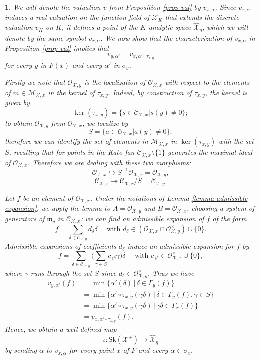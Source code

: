 \documentclass{amsart}%
\numberwithin{equation}{subsection}
\theoremstyle{plain2}
\theoremstyle{definition2}
\theoremstyle{stepstyle}
\theoremstyle{point}
\theoremstyle{subpoint}
\newtheorem{subpoint}[equation]{}%
\newcommand{\spa}[1]{\begin{subpoint}#1\end{subpoint}}           %
\newcommand{\cX}{\ensuremath{\mathscr{X}}}
\newcommand{\caM}{\ensuremath{\mathcal{M}}}
\newcommand{\caC}{\ensuremath{\mathcal{C}}}
\newcommand{\caO}{\ensuremath{\mathcal{O}}}
\newcommand{\Sk}{\mathrm{Sk}}
\begin{document}
\spa{ We will denote the valuation $v$ from Proposition
\ref{prop-val} by $v_{x,\alpha}$. Since $v_{x,\alpha}$ induces a real valuation on the function field of $\cX_K$ that extends the discrete valuation $v_K$ on $K$, it defines a point of the $K$-analytic space $\widehat{\cX}_\eta$, which we will denote by the same symbol $v_{x,\alpha}$. We now show that the characterization of $v_{x,\alpha}$ in Proposition \ref{prop-val} implies that $$v_{y,\alpha'}=v_{x,\alpha'\circ \tau_{x,y}}$$ for every $y$ in $F(x)$ and every $\alpha'$ in $\sigma_y$.

Firstly we note that  $\mathcal{O}_{\cX,y}$ is the localization of $\mathcal{O}_{\cX,x}$ with respect to the elements of $m\in \mathcal{M}_{\cX,x}$ in the kernel of $\tau_{x,y}$.
Indeed, by construction of $\tau_{x,y}$, the kernel is given by $$\ker (\tau_{x,y})= \{s \in \caC_{\cX,x} | s(y) \neq 0 \};$$ to obtain $\mathcal{O}_{\cX,y}$ from $\mathcal{O}_{\cX,x}$, we localize  by $$S=\{a \in \mathcal{O}_{\cX,x} | a(y) \neq 0 \};$$ therefore we can identify the set of elements in $\caM_{\cX,x}$ in $\ker(\tau_{x,y})$ with the set $S$, recalling that for points in the Kato fan $\mathcal{C}_{\cX,x}\setminus \{1\}$ generates the maximal ideal of $\mathcal{O}_{\cX,x}$. Therefore we are dealing with these two morphisms:
$$\caO_{\cX,x} \hookrightarrow S^{-1}\caO_{\cX,x}=\caO_{\cX,y},$$
$$ \caC_{\cX,x} \twoheadrightarrow \caC_{\cX,x}/S = \caC_{\cX,y}.$$

Let $f$ be an element of $ \caO_{\cX,x}$. Under the notations of Lemma \ref{lemma admissible expansion}, we apply the lemma to $A= \caO_{\cX,y}$ and $B=\caO_{\cX,x}$, choosing a system of generators of $\mathfrak{m}_y$ in $\caC_{\cX,x}$: we can find an admissible expansion of $f$ of the form $$f=\sum_{\delta \in \mathcal{C}_{\cX,y}}d_{\delta}\delta \quad \text{ with }d_\delta \in (\caO_{\cX,x} \cap \caO_{\cX,y}^\times) \cup \{0\}.$$ Admissible expansions of coefficients $d_\delta$ induce an admissible expansion for $f$ by $$f=\sum_{\delta \in \mathcal{C}_{\cX,y}}\big( \sum_{\gamma \in S} c_{\gamma \delta} \gamma \big)\delta \quad \text{ with }c_{\gamma \delta} \in \caO_{\cX,x}^\times \cup \{0\},$$ where $\gamma$ runs through the set $S$ since $d_\delta \in \caO_{\cX,y}^\times$. Thus we have \begin{align*}
v_{y,\alpha'}(f) &= \min\{\alpha'(\delta)\,|\,\delta\in \Gamma_y(f)\}\\
& = \min\{\alpha' \circ \tau_{x,y}( \gamma \delta)\,|\,\delta\in \Gamma_y(f), \gamma \in S\}\\
& = \min\{\alpha' \circ \tau_{x,y}( \gamma \delta)\,|\,\gamma\delta\in \Gamma_x(f)\}\\
& = v_{x,\alpha' \circ \tau_{x,y}}(f).
\end{align*}
Hence, we obtain a well-defined map $$\iota:\Sk(\cX^+)\to \widehat{\cX}_\eta$$ by sending $\alpha$ to $v_{x,\alpha}$ for every point $x$ of $F$ and every $\alpha\in \sigma_x$.}
\end{document}
